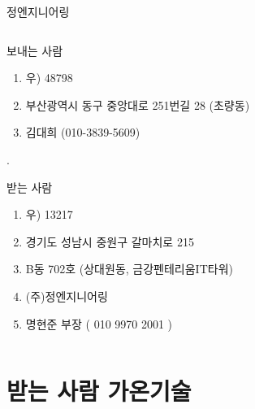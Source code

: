 \documentclass[aspectratio=1610,12pt,xcolor=pdftex,dvipsnames,table,handout]{beamer}
\begin{document}
		\begin{frame}[c,plain]{정엔지니어링}

		\begin{columns}[t]
		\begin{column}{0.80\textwidth}

			\begin{block} {보내는 사람}
			\begin{enumerate}
			\item [] 우) 48798
			\item [] 부산광역시 동구 중앙대로 251번길 28 (초량동)
			\item [] 김대희 (010-3839-5609)
			\end{enumerate}
			\end{block}
.



			\begin{block} {받는 사람}
			\begin{enumerate}
			\item [] 우) 13217
			\item [] 경기도 성남시 중원구 갈마치로 215
			\item []  B동 702호 (상대원동, 금강펜테리움IT타워)
			\item [] (주)정엔지니어링 
			\item [] 명현준 부장 ( 010 9970 2001 )
			\end{enumerate}
			\end{block}

		\end{column}

		\begin{column}{.2\textwidth}
		\end{column}
		\end{columns}

		\end{frame}


		\section{받는 사람 가온기술 }
	
\end{document}
